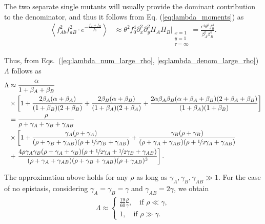 \documentclass[aps,rmp,twocolumn,groupedaddress,floatfix,notitlepage]{revtex4-1}
\begin{document}
The two separate single mutants will usually provide the dominant contribution to the denominator, and thus it follows from Eq. (\ref{eq:lambda_moments}) as
\begin{align}\label{eq:lambda_denom_large_rho}
    \left\langle f_{Ab}^2f_{aB}^2\cdot e^{-\frac{f_{A}+f_{B}}{f_0}}\right\rangle &\approx 
    \theta^2 f_0^4 \partial_x^2 \partial_y^2 H_A H_B \Bigg\vert_{\substack{x=1 \\ y=1 \\ \tau=\infty}} 
    = \frac{\epsilon^4 \theta^2 f_0^4}{\beta_A^2 \beta_B^2}.
\end{align}

Thus, from Eqs.~(\ref{eq:lambda_num_large_rho}, \ref{eq:lambda_denom_large_rho}) $\Lambda$ follows as
\begin{align}\label{eq:lambda_strong_s}
    \Lambda &\approx \frac{\alpha}{1+\beta_A + \beta_B} \\ \nonumber
    &\times \left[1 +  \frac{2\beta_A(\alpha+\beta_A)}{(1+\beta_B)(2+\beta_B)}
    +\frac{2\beta_B(\alpha+\beta_B)}{(1+\beta_A)(2+\beta_A)} + \frac{2 \alpha \beta_A \beta_B (\alpha+\beta_A+\beta_B)(2+\beta_A+\beta_B)}{(1+\beta_A)(1+\beta_B)}\right] \\ \nonumber
    &= \frac{\rho}{\rho + \gamma_A + \gamma_B + \gamma_{AB}} \\\nonumber
    &\times \left[1 +\frac{\gamma_A(\rho + \gamma_{A})}{(\rho + \gamma_B + \gamma_{AB})(\rho + \nicefrac{1}{2}\gamma_B + \gamma_{AB})} 
    +\frac{\gamma_B(\rho + \gamma_{B})}{(\rho + \gamma_A + \gamma_{AB})(\rho + \nicefrac{1}{2}\gamma_A + \gamma_{AB})} \right. \\ \nonumber
    &+\left. \frac{4 \rho \gamma_A \gamma_B (\rho+\gamma_A+\gamma_B)(\rho+\nicefrac{1}{2}\gamma_A+\nicefrac{1}{2}\gamma_B+\gamma_{AB})}{(\rho+\gamma_A+\gamma_{AB})(\rho+\gamma_B+\gamma_{AB})(\rho+\gamma_{AB})^3}\right].
\end{align}

The approximation above holds for any $\rho$ as long as $\gamma_{A}, \gamma_{B}, \gamma_{AB} \gg 1$. For the case of no epistasis, considering $\gamma_A=\gamma_B=\gamma$ and $\gamma_{AB}=2\gamma$, we obtain 
\begin{align}
    \Lambda \approx
    \begin{cases}
        \frac{19}{60}\frac{\rho}{\gamma}, \quad \text{if $\rho \ll \gamma$}, \\
        1, \quad \text{if $\rho \gg \gamma.$}
    \end{cases}
\end{align}
\end{document}
